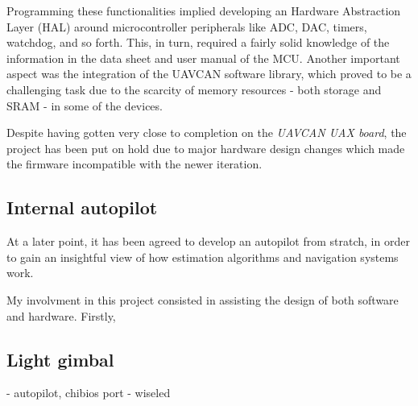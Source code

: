 Programming these functionalities implied developing an Hardware Abstraction Layer (HAL) around microcontroller peripherals like ADC, DAC, timers, watchdog, and so forth.
This, in turn, required a fairly solid knowledge of the information in the data sheet and user manual of the MCU.
Another important aspect was the integration of the UAVCAN software library, which proved to be a challenging task due to the scarcity of memory resources - both storage and SRAM - in some of the devices.

Despite having gotten very close to completion on the \emph{UAVCAN UAX board}, the project has been put on hold due to major hardware design changes which made the firmware incompatible with the newer iteration.


\subsection{Internal autopilot}
At a later point, it has been agreed to develop an autopilot from stratch, in order to gain an insightful view of how estimation algorithms and navigation systems work.

My involvment in this project consisted in assisting the design of both software and hardware.
Firstly, 


\subsection{Light gimbal}




- autopilot, chibios port
- wiseled